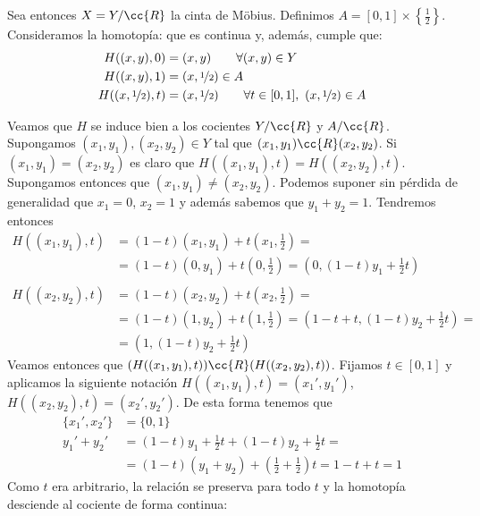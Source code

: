 \begin{ejemplo}
\begin{enumerate}
        Sea entonces $X=Y/\cc{R}$ la cinta de Möbius. Definimos $A = [0,1]\times \left\{ \frac{1}{2} \right\}$. Consideramos la homotopía:
        que es continua y, además, cumple que:
        \begin{align*}
            H((x,y),0) &= (x,y)\qquad \forall (x,y)\in Y\\
            H((x,y),1) &= \left(x, \nicefrac{1}{2}\right)\in A\\
            H((x,\nicefrac{1}{2}),t) &= (x,\nicefrac{1}{2})\qquad \forall t\in [0,1],\ (x,\nicefrac{1}{2})\in A
        \end{align*}

        Veamos que $H$ se induce bien a los cocientes $Y/\cc{R}$ y $A/\cc{R}$. Supongamos $(x_1, y_1),(x_2,y_2)\in Y$ tal que $(x_1,y_1)\cc{R}(x_2,y_2)$. Si $(x_1,y_1)=(x_2,y_2)$ es claro que $H((x_1,y_1), t) = H((x_2,y_2), t)$. Supongamos entonces que $(x_1,y_1)\neq(x_2,y_2)$. Podemos suponer sin pérdida de generalidad que $x_1=0$, $x_2=1$ y además sabemos que $y_1+y_2 = 1$. Tendremos entonces
        \begin{align*}
            H((x_1,y_1), t) &= (1-t)(x_1,y_1)+t\left(x_1, \frac{1}{2}\right) = \\
            &= (1-t)(0,y_1)+t\left(0, \frac{1}{2}\right) = \left(0,(1-t) y_1 + \frac{1}{2}t\right)\\\\
            H((x_2,y_2), t) &= (1-t)(x_2,y_2)+t\left(x_2, \frac{1}{2}\right) = \\
            &= (1-t)(1,y_2)+t\left(1, \frac{1}{2}\right) = \left(1-t+t, (1-t)y_2 + \frac{1}{2}t\right) =\\
            &= \left(1, (1-t)y_2 + \frac{1}{2}t\right)
        \end{align*}
        Veamos entonces que $(H((x_1,y_1), t))\cc{R}(H((x_2,y_2), t))$. Fijamos $t\in [0,1]$ y aplicamos la siguiente notación $H((x_1,y_1), t) = (x_1', y_1')$, $H((x_2,y_2), t) = (x_2', y_2')$. De esta forma tenemos que
        \begin{align*}
            \{x_1', x_2'\} &= \{0,1\}\\
            y_1'+y_2' &= (1-t) y_1 + \frac{1}{2}t + (1-t)y_2 + \frac{1}{2}t =\\
            &= (1-t)(y_1+y_2) + \left(\frac{1}{2} + \frac{1}{2}\right)t = 1-t + t = 1
        \end{align*}
        Como $t$ era arbitrario, la relación se preserva para todo $t$ y la homotopía desciende al cociente de forma continua:


\end{enumerate}
\end{ejemplo}
